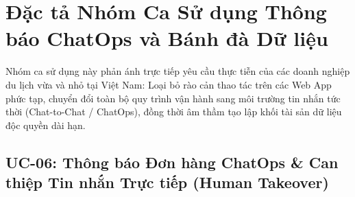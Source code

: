 \section{Đặc tả Nhóm Ca Sử dụng Thông báo ChatOps và Bánh đà Dữ liệu}
\label{sec:dacta_chatops_dataflywheel}

Nhóm ca sử dụng này phản ánh trực tiếp yêu cầu thực tiễn của các doanh nghiệp du lịch vừa và nhỏ tại Việt Nam: Loại bỏ rào cản thao tác trên các Web App phức tạp, chuyển đổi toàn bộ quy trình vận hành sang môi trường tin nhắn tức thời (Chat-to-Chat / ChatOps), đồng thời âm thầm tạo lập khối tài sản dữ liệu độc quyền dài hạn.

\subsection{UC-06: Thông báo Đơn hàng ChatOps \& Can thiệp Tin nhắn Trực tiếp (Human Takeover)}
\label{subsec:spec_uc06}


